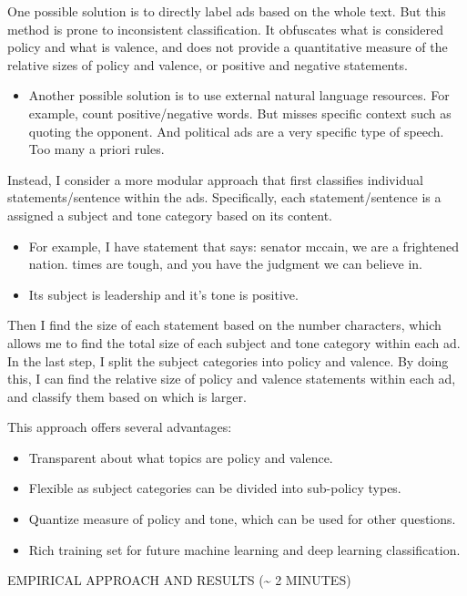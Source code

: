 \documentclass[12pt]{article}
\theoremstyle{plain}
\theoremstyle{plain}
\theoremstyle{plain}
\theoremstyle{plain}
\theoremstyle{plain}
\theoremstyle{plain}
\begin{document}
One possible solution is to directly label ads based on the whole text.
But this method is prone to inconsistent classification.
It obfuscates what is considered policy and what is valence,
and does not provide a quantitative measure of the relative sizes of policy and valence, or positive and negative statements.
\begin{itemize}
\item Another possible solution is to use external natural language resources.
For example, count positive/negative words. But misses specific context such as quoting the opponent.
And political ads are a very specific type of speech.
Too many a priori rules.
\end{itemize}

Instead, I consider a more modular approach that first classifies individual statements/sentence within the ads.
Specifically, each statement/sentence is a assigned a subject and tone category based on its content.
\begin{itemize}
\item For example, I have statement that says: senator mccain, we are a frightened nation. times are tough, and you have the judgment we can believe in.
\item Its subject is leadership and it's tone is positive.
\end{itemize}
Then I find the size of each statement based on the number characters, which allows me to find the total size of each subject and tone category within each ad.
In the last step, I split the subject categories into policy and valence.
By doing this, I can find the relative size of policy and valence statements within each ad, and classify them based on which is larger.


This approach offers several advantages:
\begin{itemize}
\item Transparent about what topics are policy and valence.
\item Flexible as subject categories can be divided into sub-policy types.
\item Quantize measure of policy and tone, which can be used for other questions.
\item Rich training set for future machine learning and deep learning classification.
\end{itemize}

\item EMPIRICAL APPROACH AND RESULTS (\textasciitilde{} 2 MINUTES)
\label{sec:orgab37f92}
\end{document}
